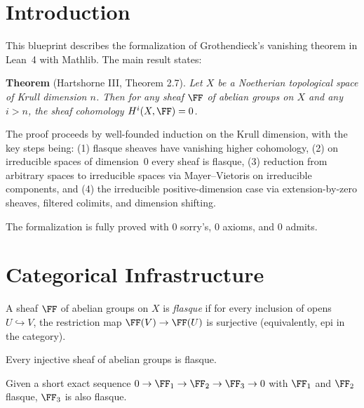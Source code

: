 
\chapter{Introduction}

This blueprint describes the formalization of Grothendieck's vanishing theorem
in Lean~4 with Mathlib. The main result states:

\medskip
\noindent\textbf{Theorem} (Hartshorne III, Theorem 2.7).
\emph{Let $X$ be a Noetherian topological space of Krull dimension $n$.
Then for any sheaf $\FF$ of abelian groups on $X$ and any $i > n$,
the sheaf cohomology $H^i(X, \FF) = 0$.}
\medskip

The proof proceeds by well-founded induction on the Krull dimension, with the
key steps being: (1) flasque sheaves have vanishing higher cohomology,
(2) on irreducible spaces of dimension~0 every sheaf is flasque,
(3) reduction from arbitrary spaces to irreducible spaces via
Mayer--Vietoris on irreducible components, and (4) the irreducible
positive-dimension case via extension-by-zero sheaves, filtered colimits,
and dimension shifting.

The formalization is fully proved with 0 sorry's, 0 axioms, and 0 admits.


\chapter{Categorical Infrastructure}\label{ch:infrastructure}

\begin{definition}\label{def:isFlasqueSheaf}
  \leanok
  A sheaf $\FF$ of abelian groups on $X$ is \emph{flasque} if for every
  inclusion of opens $U \hookrightarrow V$, the restriction map
  $\FF(V) \to \FF(U)$ is surjective (equivalently, epi in the category).
\end{definition}

\begin{lemma}\label{lem:isFlasque_of_injective}
  \leanok
  Every injective sheaf of abelian groups is flasque.
\end{lemma}

\begin{lemma}\label{lem:isFlasque_X3_of_shortExact}
  \leanok
  Given a short exact sequence $0 \to \FF_1 \to \FF_2 \to \FF_3 \to 0$
  with $\FF_1$ and $\FF_2$ flasque, $\FF_3$ is also flasque.
\end{lemma}


